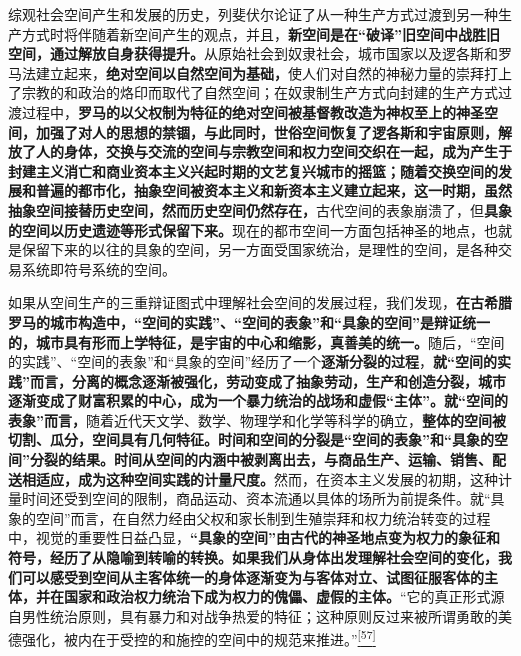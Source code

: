 \documentclass[UTF8, fontset = sourcesans, a4paper, oneside, zihao =
-4, scheme=chinese, no-math, space=true]{ctexbook}
\begin{document}
综观社会空间产生和发展的历史，列斐伏尔论证了从一种生产方式过渡到另一种生产方式时将伴随着新空间产生的观点，并且，\textbf{新空间是在``破译''旧空间中战胜旧空间，通过解放自身获得提升。}从原始社会到奴隶社会，城市国家以及逻各斯和罗马法建立起来，\textbf{绝对空间以自然空间为基础，}使人们对自然的神秘力量的崇拜打上了宗教的和政治的烙印而取代了自然空间；在奴隶制生产方式向封建的生产方式过渡过程中，\textbf{罗马的以父权制为特征的绝对空间被基督教改造为神权至上的神圣空间，加强了对人的思想的禁锢，与此同时，世俗空间恢复了逻各斯和宇宙原则，解放了人的身体，交换与交流的空间与宗教空间和权力空间交织在一起，成为产生于封建主义消亡和商业资本主义兴起时期的文艺复兴城市的摇篮；随着交换空间的发展和普遍的都市化，抽象空间被资本主义和新资本主义建立起来，这一时期，虽然抽象空间接替历史空间，然而历史空间仍然存在，}古代空间的表象崩溃了，但\textbf{具象的空间以历史遗迹等形式保留下来。}现在的都市空间一方面包括神圣的地点，也就是保留下来的以往的具象的空间，另一方面受国家统治，是理性的空间，是各种交易系统即符号系统的空间。

如果从空间生产的三重辩证图式中理解社会空间的发展过程，我们发现，\textbf{在古希腊罗马的城市构造中，``空间的实践''、``空间的表象''和``具象的空间''是辩证统一的，城市具有形而上学特征，是宇宙的中心和缩影，真善美的统一。}随后，``空间的实践''、``空间的表象''和``具象的空间''经历了一个\textbf{逐渐分裂的过程}，\textbf{就``空间的实践''而言，分离的概念逐渐被强化，劳动变成了抽象劳动，生产和创造分裂，城市逐渐变成了财富积累的中心，成为一个暴力统治的战场和虚假``主体''。就``空间的表象''而言，}随着近代天文学、数学、物理学和化学等科学的确立，\textbf{整体的空间被切割、瓜分，空间具有几何特征。时间和空间的分裂是``空间的表象''和``具象的空间''分裂的结果。时间从空间的内涵中被剥离出去，与商品生产、运输、销售、配送相适应，成为这种空间实践的计量尺度。}然而，在资本主义发展的初期，这种计量时间还受到空间的限制，商品运动、资本流通以具体的场所为前提条件。就``具象的空间''而言，在自然力经由父权和家长制到生殖崇拜和权力统治转变的过程中，视觉的重要性日益凸显，\textbf{``具象的空间''由古代的神圣地点变为权力的象征和符号，经历了从隐喻到转喻的转换。如果我们从身体出发理解社会空间的变化，我们可以感受到空间从主客体统一的身体逐渐变为与客体对立、试图征服客体的主体，并在国家和政治权力统治下成为权力的傀儡、虚假的主体。}``它的真正形式源自男性统治原则，具有暴力和对战争热爱的特征；这种原则反过来被所谓勇敢的美德强化，被内在于受控的和施控的空间中的规范来推进。''\protect\hypertarget{part0006_split_003.htmlux5cux23w57}{}{}\protect\hyperlink{part0006_split_003.htmlux5cux23m57}{\textsuperscript{{[}57{]}}}
\end{document}
